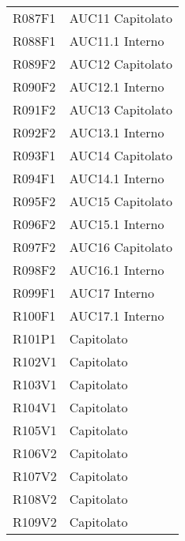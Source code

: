\documentclass[../analisi-dei-requisiti.tex]{subfiles}
\begin{document}
\begin{longtable}[H]{ p{4cm} | p{4cm} }
  R087F1                               & AUC11 Capitolato              \\
  R088F1                               & AUC11.1 Interno               \\
  R089F2                               & AUC12 Capitolato              \\
  R090F2                               & AUC12.1 Interno               \\
  R091F2                               & AUC13 Capitolato              \\
  R092F2                               & AUC13.1 Interno               \\
  R093F1                               & AUC14 Capitolato              \\
  R094F1                               & AUC14.1 Interno               \\
  R095F2                               & AUC15 Capitolato              \\
  R096F2                               & AUC15.1 Interno               \\
  R097F2                               & AUC16 Capitolato              \\
  R098F2                               & AUC16.1 Interno               \\
  R099F1                               & AUC17 Interno                 \\
  R100F1                               & AUC17.1 Interno               \\
  R101P1                               & Capitolato                    \\
  R102V1                               & Capitolato                    \\
  R103V1                               & Capitolato                    \\
  R104V1                               & Capitolato                    \\
  R105V1                               & Capitolato                    \\
  R106V2                               & Capitolato                    \\
  R107V2                               & Capitolato                    \\
  R108V2                               & Capitolato                    \\
  R109V2                               & Capitolato                    \\

\end{longtable}
\end{document}
